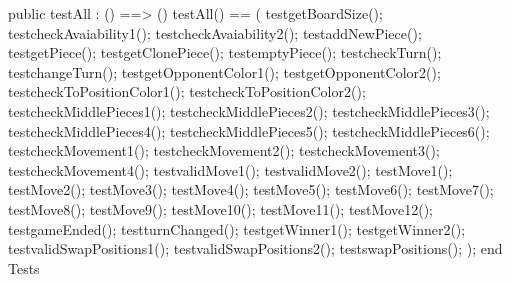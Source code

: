 \begin{vdm_al}
  public testAll : () ==> ()
   testAll() ==
   (
    testgetBoardSize();
    testcheckAvaiability1();
    testcheckAvaiability2();
    testaddNewPiece();
    testgetPiece();
    testgetClonePiece();
    testemptyPiece();
    testcheckTurn();
    testchangeTurn();
    testgetOpponentColor1();
    testgetOpponentColor2();
    testcheckToPositionColor1();
    testcheckToPositionColor2();
    testcheckMiddlePieces1();
    testcheckMiddlePieces2();
    testcheckMiddlePieces3();
    testcheckMiddlePieces4();
    testcheckMiddlePieces5();
    testcheckMiddlePieces6();
    testcheckMovement1();
    testcheckMovement2();
    testcheckMovement3();
    testcheckMovement4();
    testvalidMove1();
    testvalidMove2();
    testMove1();
    testMove2();
    testMove3();
    testMove4();
    testMove5();
    testMove6();
    testMove7();
    testMove8();
    testMove9();
    testMove10();
    testMove11();
    testMove12();
    testgameEnded();
    testturnChanged();
    testgetWinner1();
    testgetWinner2();
    testvalidSwapPositions1();
    testvalidSwapPositions2();
    testswapPositions();
   );
end Tests
\end{vdm_al}
\bigskip
